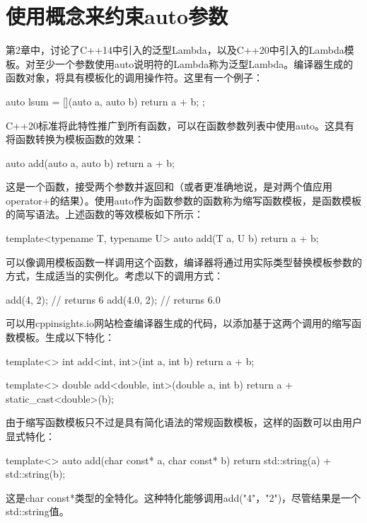 \section{使用概念来约束auto参数}
第2章中，讨论了C++14中引入的泛型Lambda，以及C++20中引入的Lambda模板。对至少一个参数使用auto说明符的Lambda称为泛型Lambda。编译器生成的函数对象，将具有模板化的调用操作符。这里有一个例子：

\begin{cpp}
auto lsum = [](auto a, auto b) {return a + b; };
\end{cpp}

C++20标准将此特性推广到所有函数，可以在函数参数列表中使用auto。这具有将函数转换为模板函数的效果：

\begin{cpp}
auto add(auto a, auto b)
{
	return a + b;
}
\end{cpp}

这是一个函数，接受两个参数并返回和（或者更准确地说，是对两个值应用operator+的结果）。使用auto作为函数参数的函数称为缩写函数模板，是函数模板的简写语法。上述函数的等效模板如下所示：

\begin{cpp}
template<typename T, typename U>
auto add(T a, U b)
{
	return a + b;
}
\end{cpp}

可以像调用模板函数一样调用这个函数，编译器将通过用实际类型替换模板参数的方式，生成适当的实例化。考虑以下的调用方式：

\begin{cpp}
add(4, 2); // returns 6
add(4.0, 2); // returns 6.0
\end{cpp}

可以用cppinsights.io网站检查编译器生成的代码，以添加基于这两个调用的缩写函数模板。生成以下特化：

\begin{cpp}
template<>
int add<int, int>(int a, int b)
{
	return a + b;
}

template<>
double add<double, int>(double a, int b)
{
	return a + static_cast<double>(b);
}
\end{cpp}

由于缩写函数模板只不过是具有简化语法的常规函数模板，这样的函数可以由用户显式特化：

\begin{cpp}
template<>
auto add(char const* a, char const* b)
{
	return std::string(a) + std::string(b);
}
\end{cpp}

这是char const*类型的全特化。这种特化能够调用add("4"，"2")，尽管结果是一个std::string值。

